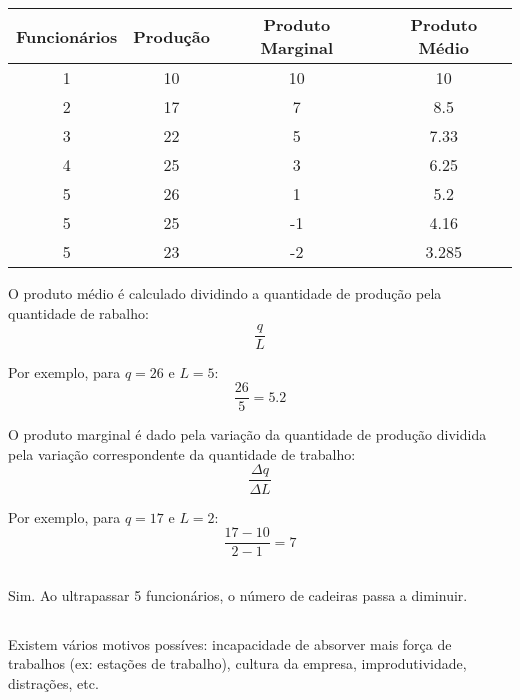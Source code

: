 \documentclass{article}
\begin{document}
\subsection{}
\begin{center}
	\begin{tabular}{|c | c | c | c|}
		\hline
		Funcionários & Produção & Produto Marginal & Produto Médio \\
		\hline
		1            & 10       & 10               & 10            \\
		\hline
		2            & 17       & 7                & 8.5           \\
		\hline
		3            & 22       & 5                & 7.33          \\
		\hline
		4            & 25       & 3                & 6.25          \\
		\hline
		5            & 26       & 1                & 5.2           \\
		\hline
		5            & 25       & -1               & 4.16          \\
		\hline
		5            & 23       & -2               & 3.285         \\
		\hline
	\end{tabular}
\end{center}

O produto médio é calculado dividindo a quantidade de produção pela quantidade
de rabalho:
\[
	\frac{q}{L}
\]

Por exemplo, para \(q = 26\) e \(L=5\):
\[
	\frac{26}{5} = 5.2
\]

O produto marginal é dado pela variação da quantidade de produção dividida pela
variação correspondente da quantidade de trabalho:
\[
	\frac{\Delta q}{\Delta L}
\]

Por exemplo, para \(q = 17\) e \(L = 2\):
\[
	\frac{17-10}{2-1} = 7
\]

\subsection{}

Sim. Ao ultrapassar 5 funcionários, o número de cadeiras passa a diminuir.

\subsection{}

Existem vários motivos possíves: incapacidade de absorver mais força de
trabalhos (ex: estações de trabalho), cultura da empresa, improdutividade,
distrações, etc.
\end{document}
